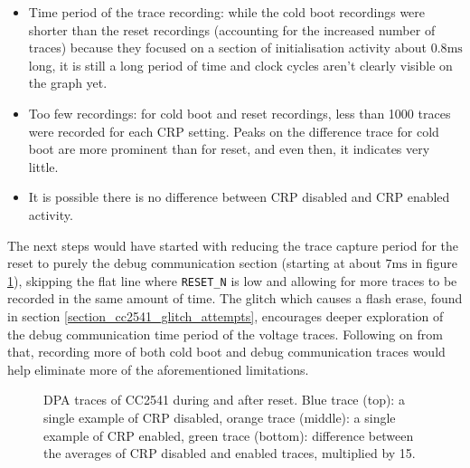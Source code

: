 \begin{itemize}
\tightlist
\item
  Time period of the trace recording: while the cold boot recordings
  were shorter than the reset recordings (accounting for the increased
  number of traces) because they focused on a section of initialisation
  activity about \(0.8\si{\milli\second}\) long, it is still a long
  period of time and clock cycles aren't clearly visible on the graph
  yet.
\item
  Too few recordings: for cold boot and reset recordings, less than 1000
  traces were recorded for each CRP setting. Peaks on the difference
  trace for cold boot are more prominent than for reset, and even then,
  it indicates very little.
\item
  It is possible there is no difference between CRP disabled and CRP
  enabled activity.
\end{itemize}

The next steps would have started with reducing the trace capture period
for the reset to purely the debug communication section (starting at
about \(7\si{\milli\second}\) in figure
\ref{img_cc2541_reset_comparison}), skipping the flat line where
\texttt{RESET\_N} is low and allowing for more traces to be recorded in
the same amount of time. The glitch which causes a flash erase, found in
section \ref{section_cc2541_glitch_attempts}, encourages deeper
exploration of the debug communication time period of the voltage
traces. Following on from that, recording more of both cold boot and
debug communication traces would help eliminate more of the
aforementioned limitations.

\begin{figure}
  \begin{center}
    \begin{scalept8}
      \begin{adjustbox}{clip,trim=0cm 0cm 0cm 1cm,min width=\textwidth}
        
      \end{adjustbox}
    \end{scalept8}
  \end{center}
  \caption{DPA traces of CC2541 during and after reset. Blue trace (top): a single example of CRP disabled, orange trace (middle): a single example of CRP enabled, green trace (bottom): difference between the averages of CRP disabled and enabled traces, multiplied by 15.\label{img_cc2541_reset_comparison}}
\end{figure}

